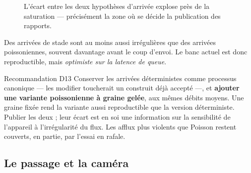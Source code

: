 \documentclass[11pt,a4paper]{article}
\begin{document}
\begin{figure}[h]
\centering
{}
\caption{L'écart entre les deux hypothèses d'arrivée explose près de la saturation —
précisément la zone où se décide la publication des rapports.}
\label{fig:md1}
\end{figure}

Des arrivées de stade sont au moins aussi irrégulières que des arrivées
poissoniennes, souvent davantage avant le coup d'envoi. Le banc actuel est donc
reproductible, mais \emph{optimiste sur la latence de queue}.

\begin{encadre}{Recommandation D13}
Conserver les arrivées déterministes comme processus canonique — les modifier
toucherait un construit déjà accepté —, et \textbf{ajouter une variante poissonienne à
graine gelée}, aux mêmes débits moyens. Une graine fixée rend la variante aussi
reproductible que la version déterministe. Publier les deux ; leur écart est en
soi une information sur la sensibilité de l'appareil à l'irrégularité du flux. Les
afflux plus violents que Poisson restent couverts, en partie, par l'essai en rafale.
\end{encadre}

\subsection{Le passage et la caméra}
\end{document}
